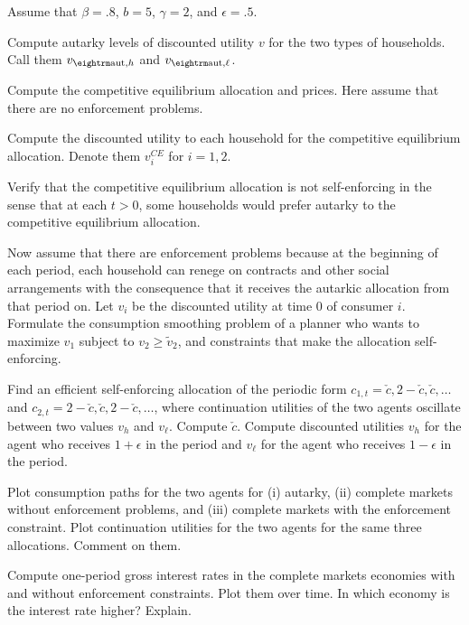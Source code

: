 \smallskip
\noindent Assume that $\beta=.8$, $b=5$, $\gamma=2$,  and $\epsilon=.5$.

\medskip
{}  Compute autarky levels of  discounted
utility  $v$ for the two types of
households.  Call them $v_{{\rm aut},h}$ and $v_{{\rm aut}, \ell}$.

\medskip
{}  Compute the competitive equilibrium allocation
and prices.  Here assume that there are no enforcement
problems.


\medskip
{} Compute the  discounted utility to each household for the
competitive equilibrium allocation.   Denote them
$v_i^{CE}$ for $i=1,2$.

\medskip
{}  Verify that the competitive equilibrium
allocation is not self-enforcing in the sense that at each
$t >0$, some households  would prefer autarky to the competitive
equilibrium allocation.

\medskip
{}   Now assume that there are enforcement problems
because at the beginning of each period, each  household can
renege on contracts and other social arrangements  with the consequence
that it receives the autarkic allocation from that period on.
 Let $v_i$  be the discounted utility at time $0$ of consumer $i$.
Formulate the consumption smoothing problem of a planner
who wants to maximize $v_1$ subject to $v_2 \geq \tilde v_2$,
and constraints that   make the allocation
 self-enforcing.

\medskip
{}   Find an efficient
 self-enforcing allocation of the periodic form
$c_{1,t} = \check c, 2- \check c, \check c , \ldots$
and
$c_{2,t} = 2- \check c, \check c, 2-  \check c , \ldots$,
where continuation utilities of the two agents
oscillate between two values  $v_h$ and $v_\ell$.
Compute $\check c$.
Compute discounted utilities $v_h$ for the agent who receives
$1+\epsilon$ in the period and $v_\ell$ for the agent
who receives $1-\epsilon$ in the period.

\medskip
\noindent Plot consumption paths for the two agents for (i) autarky,
(ii) complete markets without enforcement problems, and
(iii) complete markets with the enforcement constraint.
Plot continuation utilities for the two agents for  the
same three allocations.  Comment on them.

\medskip
{}   Compute one-period gross interest rates
in the complete markets economies with and without enforcement
constraints.  Plot them over time. In which economy
is the interest rate higher?  Explain.

